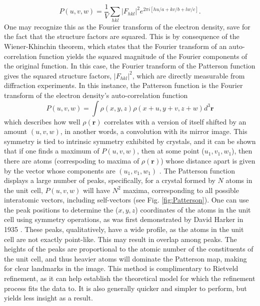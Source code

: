 \documentclass[aps,prb,twocolumn,superscriptaddress]{revtex4-2}
\begin{document}
\begin{equation}
    P(u, v, w) = \frac{1}{V} \sum_{hkl} |F_{hkl}|^2 e^{2\pi i [hu/a + kv/b + lw/c]}.
\end{equation}
One may recognize this as the Fourier transform of the electron density, save for 
the fact that the structure factors are squared. This is by consequence of the 
Wiener-Khinchin theorem, which states that the Fourier transform of an 
auto-correlation function yields the squared magnitude of the Fourier components
of the original function. In this case, the Fourier transform of the Patterson
function gives the squared structure factors, $|F_{hkl}|^2$, which are
directly measurable from diffraction experiments. In this instance, the
Patterson function is the Fourier transform of the electron density's
auto-correlation function
\begin{equation}
    P(u, v, w) = \int \rho(x, y, z) \rho(x + u, y + v, z + w) d^3\textbf{r}
\end{equation}
which describes how well $\rho(\textbf{r})$ correlates with a version of itself 
shifted by an amount $(u, v, w)$, in another words, a convolution with its 
mirror image. This symmetry is tied to intrinsic symmetry exhibited by crystals,
and it can be shown that if one finds a maximum of $P(u, v, w)$, then at some
point ($u_1, v_1, w_1$), then there are atoms (correspoding to maxima of
$\rho(\textbf{r})$) whose distance apart is given by the vector whose components
are $(u_1, v_1, w_1)$ \cite{Patterson1934}. The Patterson function displays a
large number of peaks, specifically, for a crystal formed by $N$ atoms in the
unit cell, $P(u, v, w)$ will have $N^2$ maxima, corresponding to all possible
interatomic vectors, including self-vectors (see Fig. \ref{fig:Patterson}). One
can use the peak positions to determine the ($x, y, z$) coordinates of the atoms
in the unit cell using symmetry operations, as was first demonstrated by David 
Harker in 1935 \cite{Harker1936}. These peaks, qualitatively, have a
wide profile, as the atoms in the unit cell are not exactly point-like. This may
result in overlap among peaks. The heights of the peaks are proportional to the
atomic number of the constituents of the unit cell, and thus heavier atoms will
dominate the Patterson map, making for clear landmarks in the image. This method 
is complimentary to Rietveld refinement, as it can help establish the theoretical 
model for which the refinement process fits the data to. It is also generally 
quicker and simpler to perform, but yields less insight as a result.
\end{document}
